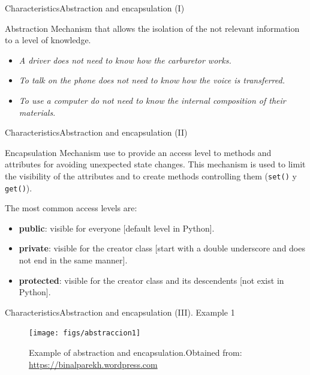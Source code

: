 \documentclass[10pt,compress]{beamer} %
\begin{document}
\begin{frame}{Characteristics}{Abstraction and encapsulation (I)}
	\begin{block}{Abstraction}
		Mechanism that allows the isolation of the not relevant information to a level of knowledge.
  	\end{block}	
	
	\begin{itemize}
		\item \textit{A driver does not need to know how the carburetor works.} 
		\item \textit{To talk on the phone does not need to know how the voice is transferred.} 
		\item \textit{To use a computer do not need to know the internal composition of their materials}. 							  
		
	\end{itemize}
\end{frame}

\begin{frame}{Characteristics}{Abstraction and encapsulation (II)}
	\begin{block}{Encapsulation}
		Mechanism use to provide an access level to methods and attributes for avoiding unexpected state changes. This mechanism is used to limit the visibility of the attributes and to create methods controlling them (\texttt{set()} y \texttt{get()}).
  	\end{block}	
	
The most common access levels are:
	
	\begin{itemize}
		\item \textbf{public}: visible for everyone  [default level in Python].
		\item \textbf{private}: visible for the creator class [start with a double underscore and does not end in the same manner].
		\item \textbf{protected}: visible for the creator class and its descendents \alert{[not exist in Python]}. 
	\end{itemize}
\end{frame}

\begin{frame}{Characteristics}{Abstraction and encapsulation (III). Example 1}
	\begin{figure}
		\texttt{[image: figs/abstraccion1]}
		\caption{{\scriptsize Example of abstraction and encapsulation.Obtained from: \url{https://binalparekh.wordpress.com}}}
	\end{figure}
\end{frame}
\end{document}
